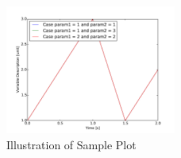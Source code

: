 \begin{figure}[htbp]
\centerline{
\includegraphics[width=0.5\textwidth]{Figures/testPlot}}
\caption{Illustration of Sample Plot}
\label{fig:testPlot}
\end{figure}
